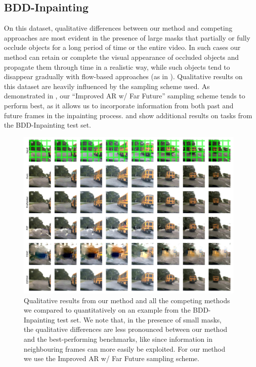 \subsection{BDD-Inpainting}
On this dataset, qualitative differences between our method and competing approaches are most evident in the presence of large masks that partially or fully occlude objects for a long period of time or the entire video. In such cases our method can retain or complete the visual appearance of occluded objects and propagate them through time in a realistic way, while such objects tend to disappear gradually with flow-based approaches (as in ). Qualitative results on this dataset are heavily influenced by the sampling scheme used. As demonstrated in , our ``Improved AR w/ Far Future'' sampling scheme tends to perform best, as it allows us to incorporate information from both past and future frames in the inpainting process.  and  show additional results on tasks from the BDD-Inpainting test set.
\begin{figure}
\begin{center}
    \centering
    \captionsetup{type=figure}
    \includegraphics[width=\linewidth]{figures/additional-samples/bus_all.pdf}
    \caption[Qualitative results from our method and all competing methods on an example from the BDD-Inpainting-Blobs test set.]{Qualitative results from our method and all the competing methods we compared to quantitatively on an example from the BDD-Inpainting test set. We note that, in the presence of small masks, the qualitative differences are less pronounced between our method and the best-performing benchmarks, like since information in neighbouring frames can more easily be exploited. For our method we use the Improved AR w/ Far Future sampling scheme.}
    \label{fig:bus}
\end{center}
\end{figure}
    
